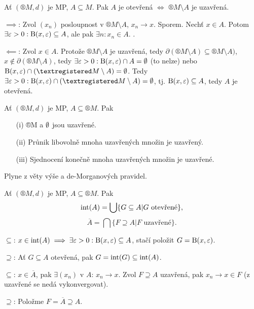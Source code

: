 \documentclass[12pt]{article}					%
\begin{document}
    \begin{veta}
        Ať $(®M, d)$ je MP, $A \subseteq M$. Pak $A$ je otevřená $\Leftrightarrow$ $®M \setminus A$ je uzavřená.

        \begin{dukazin}
            $\implies$: Zvol $(x_n)$ posloupnost v $®M \setminus A$, $x_n \rightarrow x$. Sporem. Nechť $x \in A$. Potom $\exists \varepsilon > 0: \operatorname{B}(x, \varepsilon) \subseteq A$, ale pak $\exists n: x_n \in A$. \lightning.

            $\impliedby$: Zvol $x \in A$. Protože $®M \setminus A$ je uzavřená, tedy $\partial(®M \setminus A) \subseteq ®M \setminus A)$, $x \notin \partial(®M \setminus A)$, tedy $\exists \varepsilon > 0: \operatorname{B}(x, \varepsilon) \cap A = \emptyset$ (to nelze) nebo $\B(x, \epsilon)\cap(®M\setminus A) = \O$. Tedy $\exists \epsilon > 0: \B(x, \epsilon) \cap (®M \setminus A) = \O$, tj. $\operatorname{B}(x, \varepsilon) \subseteq A$, tedy $A$ je otevřená.
        \end{dukazin}
    \end{veta}

    \begin{veta}
        Ať $(®M, d)$ je MP, $A \subseteq ®M$. Pak
        
        \begin{itemize}
            \item[(i)] ®M a $\emptyset$ jsou uzavřené.
            \item[(ii)] Průnik libovolně mnoha uzavřených množin je uzavřený.
            \item[(iii)] Sjednocení konečně mnoha uzavřených množin je uzavřené.
        \end{itemize}
        
        \begin{dukazin}
            Plyne z věty výše a de-Morganových pravidel.
        \end{dukazin}
    \end{veta}

    \begin{veta}
        Ať $(®M, d)$ je MP, $A \subseteq ®M$. Pak 
        $$ \operatorname{int}(A) = \bigcup\{G \subseteq A | G \text{ otevřené}\}, $$
        $$ \overline{A} = \bigcap\{F \supseteq A | F \text{ uzavřené}\}. $$

        \begin{dukazin}
            $\subseteq$: $x \in \operatorname{int}(A) \implies \exists \varepsilon > 0: \operatorname{B}(x, \varepsilon) \subseteq A$, stačí položit $G = \operatorname{B}(x, \varepsilon)$.

            $\supseteq$: Ať $G \subseteq A$ otevřená, pak $G = \operatorname{int}(G) \subseteq \operatorname{int}(A)$.

            $\subseteq$: $x \in \overline{A}$, pak $\exists (x_n)$ v $A$: $x_n \rightarrow x$. Zvol $F \supseteq A$ uzavřená, pak $x_n \rightarrow x \in F$ (z uzavřené se nedá vykonvergovat).

            $\supseteq$: Položme $F = \overline{A} \supseteq A$.
        \end{dukazin}
    \end{veta}
\end{document}
